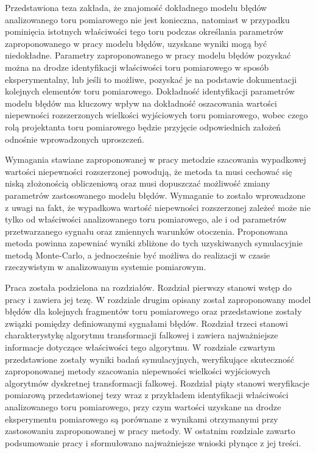 Przedstawiona teza zakłada, że znajomość dokładnego modelu błędów analizowanego toru pomiarowego nie jest konieczna, natomiast w przypadku pominięcia istotnych właściwości tego toru podczas określania parametrów zaproponowanego w pracy modelu błędów, uzyskane wyniki mogą być niedokładne. Parametry zaproponowanego w pracy modelu błędów pozyskać można na drodze identyfikacji właściwości toru pomiarowego w sposób eksperymentalny, lub jeśli to możliwe, pozyskać je na podstawie dokumentacji kolejnych elementów toru pomiarowego. Dokładność identyfikacji parametrów modelu błędów ma kluczowy wpływ na dokładność oszacowania wartości niepewności rozszerzonych wielkości wyjściowych toru pomiarowego, wobec czego rolą projektanta toru pomiarowego będzie przyjęcie odpowiednich założeń odnośnie wprowadzonych uproszczeń.

Wymagania stawiane zaproponowanej w pracy metodzie szacowania wypadkowej wartości niepewności rozszerzonej powodują, że metoda ta musi cechować się niską złożonością obliczeniową oraz musi dopuszczać możliwość zmiany parametrów zastosowanego modelu błędów. Wymaganie to zostało wprowadzone z uwagi na fakt, że wypadkowa wartość niepewności rozszerzonej zależeć może nie tylko od właściwości analizowanego toru pomiarowego, ale i od parametrów przetwarzanego sygnału oraz zmiennych warunków otoczenia. Proponowana metoda powinna zapewniać wyniki zbliżone do tych uzyskiwanych symulacyjnie metodą Monte-Carlo, a jednocześnie być możliwa do realizacji w czasie rzeczywistym w analizowanym systemie pomiarowym.

Praca została podzielona na  rozdziałów. Rozdział pierwszy stanowi wstęp do pracy i zawiera jej tezę. W rozdziale drugim opisany został zaproponowany model błędów dla kolejnych fragmentów toru pomiarowego oraz przedstawione zostały związki pomiędzy definiowanymi sygnałami błędów. Rozdział trzeci stanowi charakterystykę algorytmu transformacji falkowej i zawiera najważniejsze informacje dotyczące właściwości tego algorytmu. W rozdziale czwartym przedstawione zostały wyniki badań symulacyjnych, weryfikujące skuteczność zaproponowanej metody szacowania niepewności wielkości wyjściowych algorytmów dyskretnej transformacji falkowej. Rozdział piąty stanowi weryfikacje pomiarową przedstawionej tezy wraz z przykładem identyfikacji właściwości analizowanego toru pomiarowego, przy czym wartości uzyskane na drodze eksperymentu pomiarowego są porównane z wynikami otrzymanymi przy zastosowaniu zaproponowanej w pracy metody. W ostatnim rozdziale zawarto podsumowanie pracy i sformułowano najważniejsze wnioski płynące z jej treści.

